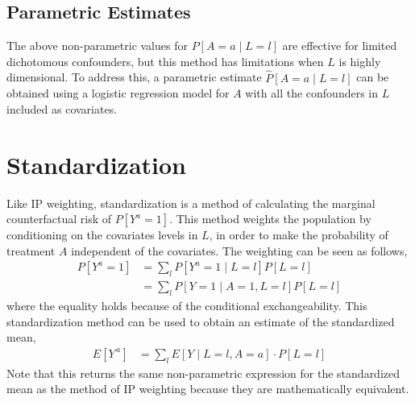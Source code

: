 \subsection{Parametric Estimates} 
The above non-parametric values for $P[A=a\mid L=l]$ are effective for limited dichotomous confounders, but this method has limitations when $L$ is highly dimensional.  To address this, a parametric estimate $\widehat{P}[A=a\mid L=l]$ can be obtained using a logistic regression model for $A$ with all the confounders in $L$ included as covariates.  

\section{Standardization} \label{Standardization} 
Like IP weighting, standardization is a method of calculating the marginal counterfactual risk of $P[Y^a = 1]$.  This method weights the population by  conditioning on the covariates levels in $L$, in order to make the probability of treatment $A$ independent of the covariates.  The weighting can be seen as follows, 
\begin{align} 
P[Y^a = 1] &= \sum_l P[Y^a = 1 \mid L=l] P[L = l] \\ 
&= \sum_l P[Y = 1 \mid A=1, L=l] P[L = l]  
\end{align} 
where the equality holds because of the conditional exchangeability.  This standardization method can be used to obtain an estimate of the standardized mean, 
\begin{align} 
E[Y^{\,a}] &= \sum_{l} E[Y \mid L = l, A =a ] \cdot P[L=l] 
\end{align} 
Note that this returns the same non-parametric expression for the standardized mean as the method of IP weighting because they are mathematically equivalent.  
